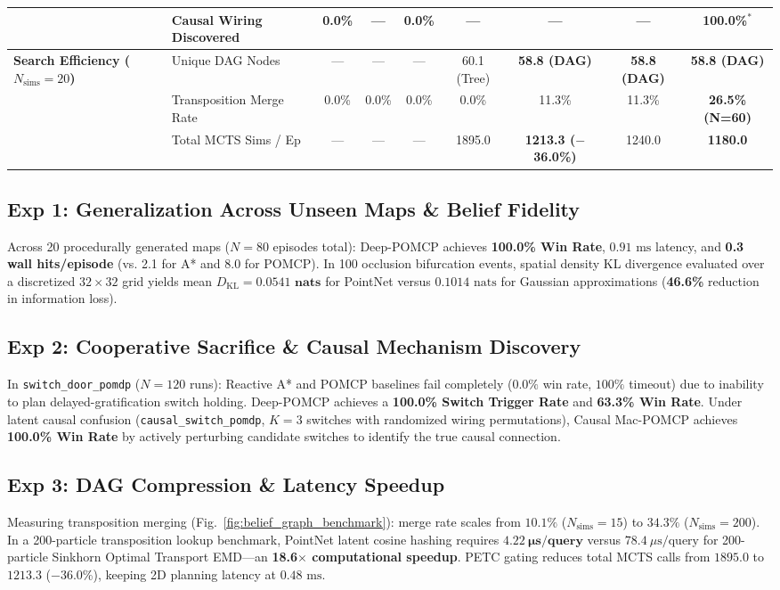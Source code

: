 \documentclass[conference]{IEEEtran}
\begin{document}
\begin{table}[t]
{\begin{tabular}{@{}llccccccc@{}}
& Causal Wiring Discovered & 0.0\% & --- & 0.0\% & --- & --- & --- & \textbf{100.0\%}$^*$ \\
\midrule
\textbf{Search Efficiency ($N_{\text{sims}}=20$)} & Unique DAG Nodes & --- & --- & --- & 60.1 (Tree) & \textbf{58.8 (DAG)} & \textbf{58.8 (DAG)} & \textbf{58.8 (DAG)} \\
& Transposition Merge Rate & 0.0\% & 0.0\% & 0.0\% & 0.0\% & 11.3\% & 11.3\% & \textbf{26.5\% (N=60)} \\
& Total MCTS Sims / Ep & --- & --- & --- & 1895.0 & \textbf{1213.3 ($-$36.0\%)} & 1240.0 & \textbf{1180.0} \\
\bottomrule
\end{tabular}%
}
\end{table}

\subsection{Exp 1: Generalization Across Unseen Maps \& Belief Fidelity}
Across 20 procedurally generated maps ($N=80$ episodes total): Deep-POMCP achieves \textbf{100.0\% Win Rate}, $0.91\text{ ms}$ latency, and \textbf{0.3 wall hits/episode} (vs. 2.1 for A* and 8.0 for POMCP). In 100 occlusion bifurcation events, spatial density KL divergence evaluated over a discretized $32 \times 32$ grid yields mean $D_{\text{KL}} = \mathbf{0.0541\text{ nats}}$ for PointNet versus $0.1014\text{ nats}$ for Gaussian approximations (\textbf{46.6\%} reduction in information loss).

\subsection{Exp 2: Cooperative Sacrifice \& Causal Mechanism Discovery}
In \texttt{switch\_door\_pomdp} ($N=120$ runs): Reactive A* and POMCP baselines fail completely ($0.0\%$ win rate, $100\%$ timeout) due to inability to plan delayed-gratification switch holding. Deep-POMCP achieves a \textbf{100.0\% Switch Trigger Rate} and \textbf{63.3\% Win Rate}. Under latent causal confusion (\texttt{causal\_switch\_pomdp}, $K=3$ switches with randomized wiring permutations), Causal Mac-POMCP achieves \textbf{100.0\% Win Rate} by actively perturbing candidate switches to identify the true causal connection.

\subsection{Exp 3: DAG Compression \& Latency Speedup}
Measuring transposition merging (Fig.~\ref{fig:belief_graph_benchmark}): merge rate scales from $10.1\%$ ($N_{\text{sims}}=15$) to $\mathbf{34.3\%}$ ($N_{\text{sims}}=200$). In a 200-particle transposition lookup benchmark, PointNet latent cosine hashing requires $\mathbf{4.22\ \mu s/query}$ versus $78.4\ \mu\text{s/query}$ for 200-particle Sinkhorn Optimal Transport EMD---an \textbf{18.6$\times$ computational speedup}. PETC gating reduces total MCTS calls from $1895.0$ to $1213.3$ ($-$36.0\%), keeping 2D planning latency at $0.48\text{ ms}$.
\end{document}
